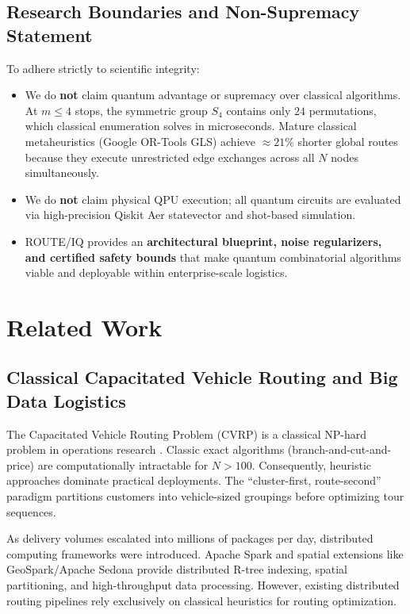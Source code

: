 \documentclass[journal,10pt]{IEEEtran}
\begin{document}
\subsection{Research Boundaries and Non-Supremacy Statement}
To adhere strictly to scientific integrity:
\begin{itemize}
    \item We do \textbf{not} claim quantum advantage or supremacy over classical algorithms. At $m \le 4$ stops, the symmetric group $S_4$ contains only $24$ permutations, which classical enumeration solves in microseconds. Mature classical metaheuristics (Google OR-Tools GLS) achieve $\approx 21\%$ shorter global routes because they execute unrestricted edge exchanges across all $N$ nodes simultaneously.
    \item We do \textbf{not} claim physical QPU execution; all quantum circuits are evaluated via high-precision Qiskit Aer statevector and shot-based simulation.
    \item ROUTE/IQ provides an \textbf{architectural blueprint, noise regularizers, and certified safety bounds} that make quantum combinatorial algorithms viable and deployable within enterprise-scale logistics.
\end{itemize}

\section{Related Work}
\subsection{Classical Capacitated Vehicle Routing and Big Data Logistics}
The Capacitated Vehicle Routing Problem (CVRP) is a classical NP-hard problem in operations research \cite{toth2014vehicle}. Classic exact algorithms (branch-and-cut-and-price) are computationally intractable for $N > 100$. Consequently, heuristic approaches dominate practical deployments. The ``cluster-first, route-second'' paradigm \cite{clarke1964scheduling, gillett1974sweep} partitions customers into vehicle-sized groupings before optimizing tour sequences.

As delivery volumes escalated into millions of packages per day, distributed computing frameworks were introduced. Apache Spark \cite{zaharia2016apache} and spatial extensions like GeoSpark/Apache Sedona \cite{yu2015geospark} provide distributed R-tree indexing, spatial partitioning, and high-throughput data processing. However, existing distributed routing pipelines rely exclusively on classical heuristics for routing optimization.
\end{document}
